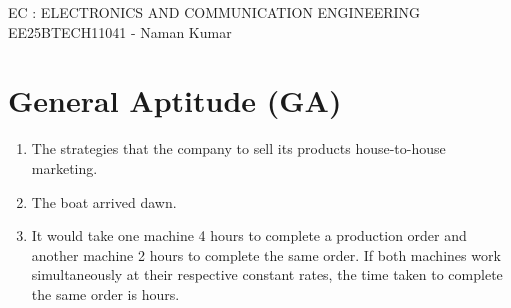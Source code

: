 \documentclass[a4paper, 11pt]{article}
\begin{document}
\begin{center}
    \huge{EC : ELECTRONICS AND COMMUNICATION ENGINEERING}\\
    \large{EE25BTECH11041 - Naman Kumar}
\end{center}
\section*{General Aptitude (GA)}
\begin{enumerate}
    \item The strategies that the company \underline{\hspace{2cm}} to sell its products \underline{\hspace{2cm}} house-to-house marketing.
    \begin{enumerate}
    \end{enumerate}
    \hfill{}

    \item The boat arrived \underline{\hspace{2cm}} dawn.
    \begin{enumerate}
    \end{enumerate}
    \hfill{}

    \item It would take one machine 4 hours to complete a production order and another machine 2 hours to complete the same order. If both machines work simultaneously at their respective constant rates, the time taken to complete the same order is \underline{\hspace{2cm}} hours.
    \begin{enumerate}
    \end{enumerate}
    \hfill{}


\end{enumerate}
\end{document}
